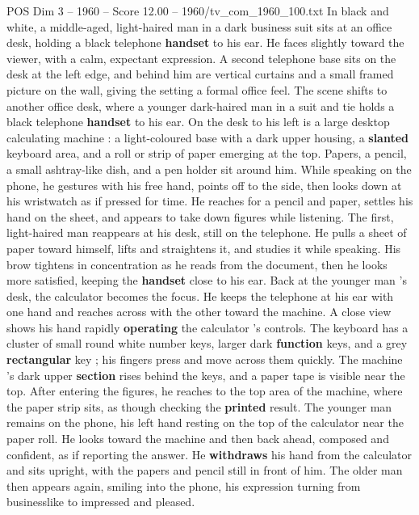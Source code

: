 \begin{textsample}{POS Dim 3 – 1960 – Score 12.00 – 1960/tv\_com\_1960\_100.txt}  \label{ex:f3_pos_028}
In black and white, a middle-aged, light-haired man in a dark business suit sits at an office desk, holding a black telephone \textbf{handset} to his ear.
He faces slightly toward the viewer, with a calm, expectant expression.
A second telephone base sits on the desk at the left edge, and behind him are vertical curtains and a small framed picture on the wall, giving the setting a formal office feel.
The scene shifts to another office desk, where a younger dark-haired man in a suit and tie holds a black telephone \textbf{handset} to his ear.
On the desk to his left is a large desktop calculating machine : a light-coloured base with a dark upper housing, a \textbf{slanted} keyboard area, and a roll or strip of paper emerging at the top.
Papers, a pencil, a small ashtray-like dish, and a pen holder sit around him.
While speaking on the phone, he gestures with his free hand, points off to the side, then looks down at his wristwatch as if pressed for time.
He reaches for a pencil and paper, settles his hand on the sheet, and appears to take down figures while listening.
The first, light-haired man reappears at his desk, still on the telephone.
He pulls a sheet of paper toward himself, lifts and straightens it, and studies it while speaking.
His brow tightens in concentration as he reads from the document, then he looks more satisfied, keeping the \textbf{handset} close to his ear.
Back at the younger man ’s desk, the calculator becomes the focus.
He keeps the telephone at his ear with one hand and reaches across with the other toward the machine.
A close view shows his hand rapidly \textbf{operating} the calculator ’s controls.
The keyboard has a cluster of small round white number keys, larger dark \textbf{function} keys, and a grey \textbf{rectangular} key ; his fingers press and move across them quickly.
The machine ’s dark upper \textbf{section} rises behind the keys, and a paper tape is visible near the top.
After entering the figures, he reaches to the top area of the machine, where the paper strip sits, as though checking the \textbf{printed} result.
The younger man remains on the phone, his left hand resting on the top of the calculator near the paper roll.
He looks toward the machine and then back ahead, composed and confident, as if reporting the answer.
He \textbf{withdraws} his hand from the calculator and sits upright, with the papers and pencil still in front of him.
The older man then appears again, smiling into the phone, his expression turning from businesslike to impressed and pleased.

\end{textsample}
